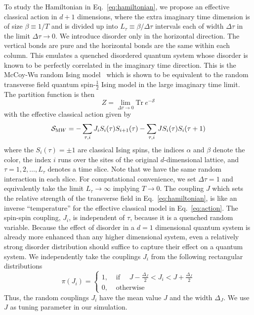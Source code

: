 \documentclass[aps,prl,twocolumn,10pt,notitlepage]{revtex4-1}
\begin{document}
To study the Hamiltonian in Eq.~\eqref{eq:hamiltonian}, we propose an effective classical action in $d+1$ dimensions, where the extra imaginary time dimension is of size $\beta \equiv 1/T$ and is divided up into $L_\tau \equiv \beta/\Delta \tau$ intervals each of width $\Delta \tau$ in the limit $\Delta \tau \to 0$. We introduce disorder only in the horizontal direction. The vertical bonds are pure and the horizontal bonds are the same within each column. This emulates a quenched disordered quantum system whose disorder is known to be perfectly correlated in the imaginary time direction. This is the McCoy-Wu random Ising model~\cite{mccoyPR1968I,mccoyPR1969II,mccoyPR1969III,shankarPRB1987} which is shown to be equivalent to the random transverse field quantum spin-$\frac{1}{2}$ Ising model in the large imaginary time limit.
The partition function is then
\begin{equation}
	Z = \lim_{\Delta \tau \to 0} \mathrm{Tr}~e^{-\mathcal{S}}
\end{equation}
with the effective classical action given by
\begin{equation}\label{eq:action}
	\mathcal{S}_{\text MW} =
	-\sum_{\tau,i} J_{i} S_{i}(\tau) S_{i+1}(\tau)
	-\sum_{\tau,i} J S_{i}(\tau) S_{i}(\tau+1)
\end{equation}
where the $S_i(\tau) = \pm 1$ are classical Ising spins, the indices $\alpha$ and $\beta$ denote the color, the index $i$ runs over the sites of the original $d$-dimensional lattice, and $\tau = 1, 2, \dots, L_\tau$ denotes a time slice. Note that we have the same random interaction in each slice. For computational convenience, we set $\Delta \tau = 1$ and equivalently take the limit $L_\tau \to \infty$ implying $T \to 0$. The coupling $J$ which sets the relative strength of the transverse field in Eq.~\eqref{eq:hamiltonian}, is like an inverse ``temperature'' for the effective classical model in Eq.~\eqref{eq:action}. The spin-spin coupling, $J_i$, is independent of $\tau$, because it is a quenched random variable. Because the effect of disorder in a $d = 1$ dimensional quantum system is already more enhanced than any higher dimensional system, even a relatively strong disorder distribution should suffice to capture their effect on a quantum system. We independently take the couplings $J_i$ from the following rectangular distributions
\begin{equation}\label{eq:disorderDistribution}
	\pi(J_i) = 
	\begin{cases}
		1, &\text{ if }\quad J-\frac{\Delta_J}{2} < J_i < J+\frac{\Delta_J}{2}\\
		0, &\text{ otherwise}
	\end{cases}
\end{equation}
Thus, the random couplings $J_i$ have the mean value $J$ and the width $\Delta_J$. We use $J$ as tuning parameter in our simulation.
\end{document}
